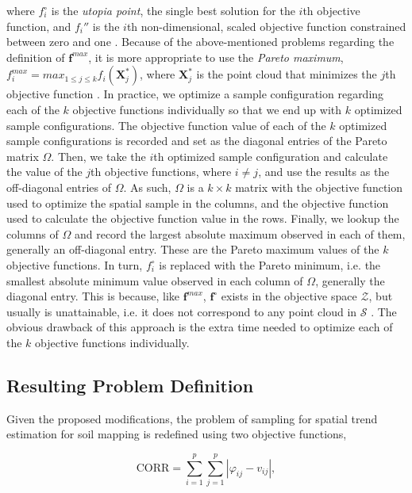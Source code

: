 \noindent where $f_i^{\circ}$ is the \emph{utopia point}, the single best solution for the $i$th objective 
function, and $f_i''$ is the $i$th non-dimensional, scaled objective function constrained between zero and one 
\cite{MarlerEtAl2005}. Because of the above-mentioned problems regarding the definition of 
$\boldsymbol{f}^{max}$, it is more appropriate to use the \emph{Pareto maximum}, $f_i^{max} = max_{1 \leq j 
\leq k} f_ i(\boldsymbol{X}_j^*)$, where $\boldsymbol{X}_j^*$ is the point cloud that minimizes the $j$th 
objective function \cite{MarlerEtAl2005}. In practice, we optimize a sample configuration regarding each of the 
$k$ objective functions individually so that we end up with $k$ optimized sample configurations. The objective 
function value of each of the $k$ optimized sample configurations is recorded and set as the diagonal entries 
of the Pareto matrix $\varOmega$. Then, we take the $i$th optimized sample configuration and calculate the 
value of the $j$th objective functions, where $i \neq j$, and use the results as the off-diagonal entries of 
$\varOmega$. As such, $\varOmega$ is a $k \times k$ matrix with the objective function used to optimize the 
spatial sample in the columns, and the objective function used to calculate the objective function value in the 
rows. Finally, we lookup the columns of $\varOmega$ and record the largest absolute maximum observed in each of 
them, generally an off-diagonal entry. These are the Pareto maximum values of the $k$ objective functions. In 
turn, $f_i^{\circ}$ is replaced with the Pareto minimum, i.e. the smallest absolute minimum value observed in 
each column of $\varOmega$, generally the diagonal entry. This is because, like $\boldsymbol{f}^{max}$, 
$\boldsymbol{f}^{\circ}$ exists in the objective space $\mathcal{Z}$, but usually is unattainable, i.e. it does 
not correspond to any point cloud in $\mathcal{S}$ \cite{Arora2011}. The obvious drawback of this approach is 
the extra time needed to optimize each of the $k$ objective functions individually.

\subsection{Resulting Problem Definition}

Given the proposed modifications, the problem of sampling for spatial trend estimation for soil mapping is 
redefined using two objective functions,

\begin{equation}\label{eqn:chap08-corr} %
 \text{CORR} = \sum_{i=1}^{p}\sum_{j=1}^{p}|\varphi_{ij} - v_{ij}|,
\end{equation}

